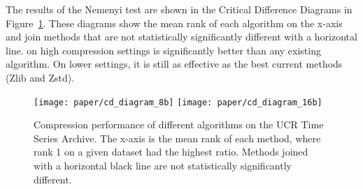The results of the Nemenyi test are shown in the Critical Difference Diagrams \cite{cdDiagrams} in Figure~\ref{fig:ratioCD}. These diagrams show the mean rank of each algorithm on the x-axis and join methods that are not statistically significantly different with a horizontal line. \minesp on high compression settings is significantly better than any existing algorithm. On lower settings, it is still as effective as the best current methods (Zlib and Zstd).





\begin{figure}[h]
\begin{center}
    \texttt{[image: paper/cd\_diagram\_8b]}
    \texttt{[image: paper/cd\_diagram\_16b]}
    \caption{Compression performance of different algorithms on the UCR Time Series Archive. The x-axis is the mean rank of each method, where rank 1 on a given dataset had the highest ratio. Methods joined with a horizontal black line are not statistically significantly different.}
    \label{fig:ratioCD}
    \vspace{-5mm}
\end{center}
\end{figure}

